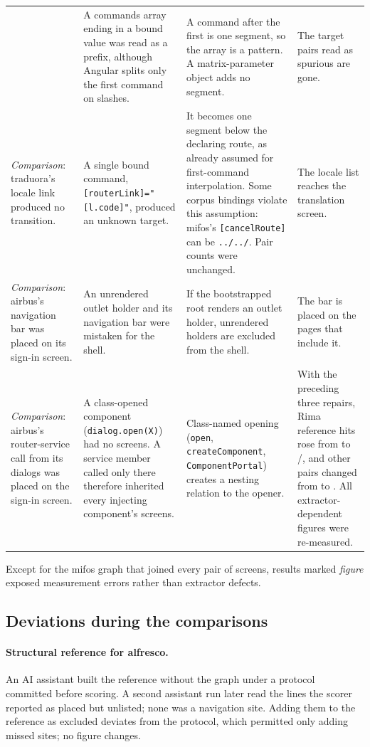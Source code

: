 \begin{xltabular}{\textwidth}{@{}YYYY@{}}
  & A commands array ending in a bound value was read as a prefix, although Angular splits only the first command on slashes.
  & A command after the first is one segment, so the array is a pattern. A matrix-parameter object adds no segment.
  & The target pairs read as spurious are gone. \\
\emph{Comparison}: traduora's locale link produced no transition.
  & A single bound command, \texttt{[routerLink]=}\allowbreak\texttt{"[l.code]"}, produced an unknown target.
  & It becomes one segment below the declaring route, as already assumed for first-command interpolation. Some corpus bindings violate this assumption: mifos's \texttt{[cancelRoute]} can be \texttt{../../}. Pair counts were unchanged.
  & The locale list reaches the translation screen. \\
\emph{Comparison}: airbus's navigation bar was placed on its sign-in screen.
  & An unrendered outlet holder and its navigation bar were mistaken for the shell.
  & If the bootstrapped root renders an outlet holder, unrendered holders are excluded from the shell.
  & The bar is placed on the pages that include it. \\
\emph{Comparison}: airbus's router-service call from its dialogs was placed on the sign-in screen.
  & A class-opened component (\texttt{dialog.open(X)}) had no screens. A service member called only there therefore inherited every injecting component's screens.
  & Class-named opening (\texttt{open}, \texttt{createComponent}, \texttt{ComponentPortal}) creates a nesting relation to the opener.
  & With the preceding three repairs, Rima reference hits rose from \RimaHitFull{} to \RimaRepHitFull{}/\RimaPairs{}, and other pairs changed from \RimaExtra{} to \RimaRepExtra{}. All extractor-dependent figures were re-measured. \\
\end{xltabular}
\par{}
\endgroup

Except for the mifos graph that joined every pair of screens, results marked \emph{figure} exposed measurement errors rather than extractor defects.

\subsection{Deviations during the comparisons}
\label{app:deviations}

\paragraph{Structural reference for alfresco.} An AI assistant built the reference without the graph
under a protocol committed before scoring. A second assistant run later read the lines the
scorer reported as placed but unlisted; none was a navigation site. Adding them to the reference as
excluded deviates from the protocol, which permitted only adding missed sites; no figure changes.

